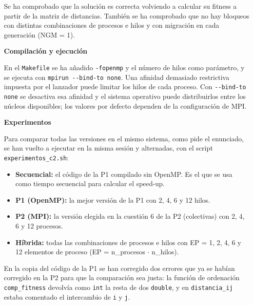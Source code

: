 \documentclass[12pt]{article}
\begin{document}
\begin{enumerate}
Se ha comprobado que la solución es correcta volviendo a calcular su fitness a partir de la matriz de distancias. También se ha comprobado que no hay bloqueos con distintas combinaciones de procesos e hilos y con migración en cada generación (NGM = 1).

\vspace{0.5cm}

\medskip
\noindent\textbf{Compilación y ejecución}\par
\smallskip

En el \texttt{Makefile} se ha añadido \texttt{-fopenmp} y el número de hilos como parámetro, y se ejecuta con \texttt{mpirun -{}-bind-to none}. Una afinidad demasiado restrictiva impuesta por el lanzador puede limitar los hilos de cada proceso. Con \texttt{-{}-bind-to none} se desactiva esa afinidad y el sistema operativo puede distribuirlos entre los núcleos disponibles; los valores por defecto dependen de la configuración de MPI.

\vspace{0.5cm}

\medskip
\noindent\textbf{Experimentos}\par
\smallskip

Para comparar todas las versiones en el mismo sistema, como pide el enunciado, se han vuelto a ejecutar en la misma sesión y alternadas, con el script \texttt{experimentos\_c2.sh}:

\begin{itemize}
    \item \textbf{Secuencial:} el código de la P1 compilado sin OpenMP. Es el que se usa como tiempo secuencial para calcular el speed-up.
    \item \textbf{P1 (OpenMP):} la mejor versión de la P1 con 2, 4, 6 y 12 hilos.
    \item \textbf{P2 (MPI):} la versión elegida en la cuestión 6 de la P2 (colectivas) con 2, 4, 6 y 12 procesos.
    \item \textbf{Híbrida:} todas las combinaciones de procesos e hilos con EP = 1, 2, 4, 6 y 12 elementos de proceso (EP = n\_procesos $\cdot$ n\_hilos).
\end{itemize}

En la copia del código de la P1 se han corregido dos errores que ya se habían corregido en la P2 para que la comparación sea justa: la función de ordenación \texttt{comp\_fitness} devolvía como \texttt{int} la resta de dos \texttt{double}, y en \texttt{distancia\_ij} estaba comentado el intercambio de \texttt{i} y \texttt{j}.


\end{enumerate}
\end{document}
